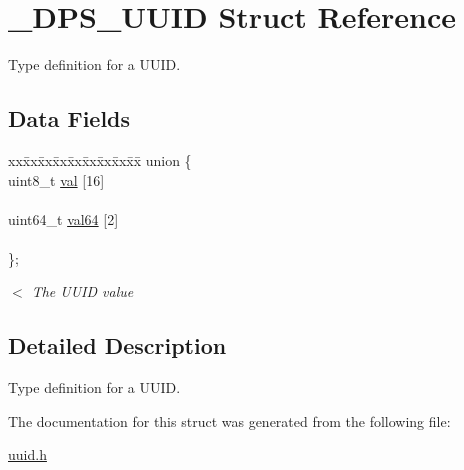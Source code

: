 \hypertarget{struct___d_p_s___u_u_i_d}{}\section{\+\_\+\+D\+P\+S\+\_\+\+U\+U\+ID Struct Reference}
\label{struct___d_p_s___u_u_i_d}


Type definition for a U\+U\+ID.  


\subsection*{Data Fields}
\begin{DoxyCompactItemize}
\item 
\mbox{\label{struct___d_p_s___u_u_i_d_ac01a70f40b7080c7d6e42bd538456f35}} 
\begin{tabbing}
xx\=xx\=xx\=xx\=xx\=xx\=xx\=xx\=xx\=\kill
union \{\\
\>uint8\_t \hyperlink{struct___d_p_s___u_u_i_d_a5f642859395d3916ea96804c6bf16880}{val} \mbox{[}16\mbox{]}\\
\>\\
\>uint64\_t \hyperlink{struct___d_p_s___u_u_i_d_aee3748c444033b543f494e8bf6d64645}{val64} \mbox{[}2\mbox{]}\\
\>\\
\}; \\

\end{tabbing}\begin{DoxyCompactList}\small\item\em $<$ The U\+U\+ID value \end{DoxyCompactList}\end{DoxyCompactItemize}


\subsection{Detailed Description}
Type definition for a U\+U\+ID. 

The documentation for this struct was generated from the following file\+:\begin{DoxyCompactItemize}
\item 
\hyperlink{uuid_8h}{uuid.\+h}\end{DoxyCompactItemize}
